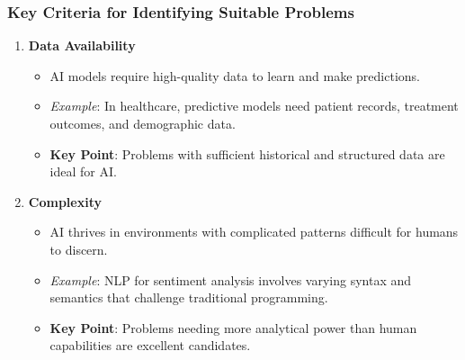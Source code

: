 \documentclass{beamer}
\begin{document}
\begin{frame}[fragile]
    \frametitle{Key Criteria for Identifying Suitable Problems}
    \begin{enumerate}
        \item \textbf{Data Availability}
            \begin{itemize}
                \item AI models require high-quality data to learn and make predictions. 
                \item \textit{Example}: In healthcare, predictive models need patient records, treatment outcomes, and demographic data.
                \item \textbf{Key Point}: Problems with sufficient historical and structured data are ideal for AI.
            \end{itemize}
        \item \textbf{Complexity}
            \begin{itemize}
                \item AI thrives in environments with complicated patterns difficult for humans to discern.
                \item \textit{Example}: NLP for sentiment analysis involves varying syntax and semantics that challenge traditional programming.
                \item \textbf{Key Point}: Problems needing more analytical power than human capabilities are excellent candidates.
            \end{itemize}
    \end{enumerate}
\end{frame}
\end{document}

